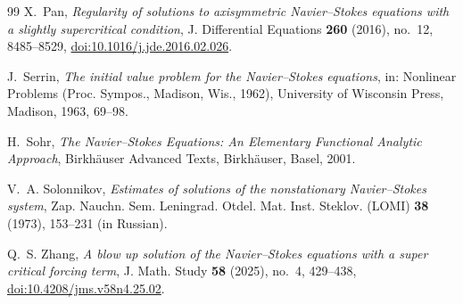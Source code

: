 \documentclass[10pt]{amsart}
\theoremstyle{definition}
\begin{document}
\begin{thebibliography}{99}
X.~Pan,
\emph{Regularity of solutions to axisymmetric Navier--Stokes equations with a
slightly supercritical condition},
J. Differential Equations \textbf{260} (2016), no.~12, 8485--8529,
\href{https://doi.org/10.1016/j.jde.2016.02.026}{doi:10.1016/j.jde.2016.02.026}.

J.~Serrin,
\emph{The initial value problem for the Navier--Stokes equations},
in: Nonlinear Problems (Proc. Sympos., Madison, Wis., 1962),
University of Wisconsin Press, Madison, 1963, 69--98.

H.~Sohr,
\emph{The Navier--Stokes Equations: An Elementary Functional Analytic Approach},
Birkh\"auser Advanced Texts, Birkh\"auser, Basel, 2001.

V.~A. Solonnikov,
\emph{Estimates of solutions of the nonstationary Navier--Stokes system},
Zap. Nauchn. Sem. Leningrad. Otdel. Mat. Inst. Steklov. (LOMI)
\textbf{38} (1973), 153--231 (in Russian).

Q.~S. Zhang,
\emph{A blow up solution of the Navier--Stokes equations with a super critical
forcing term},
J. Math. Study \textbf{58} (2025), no.~4, 429--438,
\href{https://doi.org/10.4208/jms.v58n4.25.02}{doi:10.4208/jms.v58n4.25.02}.

\end{thebibliography}
\end{document}
